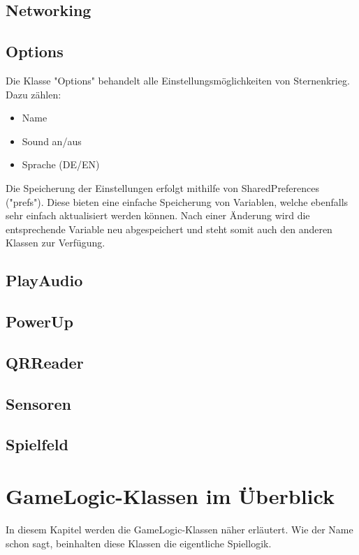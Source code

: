 \documentclass[11pt]{article} %
\begin{document}
\subsection{Networking}

\subsection{Options}
Die Klasse "Options" behandelt alle Einstellungsmöglichkeiten von Sternenkrieg. Dazu zählen:
\begin{itemize}
\item Name
\item Sound an/aus
\item Sprache (DE/EN)
\end{itemize}
Die Speicherung der Einstellungen erfolgt mithilfe von SharedPreferences ("prefs"). Diese bieten eine einfache Speicherung von Variablen, welche ebenfalls sehr einfach aktualisiert werden können. Nach einer Änderung wird die entsprechende Variable neu abgespeichert und steht somit auch den anderen Klassen zur Verfügung.

\subsection{PlayAudio}

\subsection{PowerUp}

\subsection{QRReader}

\subsection{Sensoren}

\subsection{Spielfeld}

\section{GameLogic-Klassen im Überblick}
In diesem Kapitel werden die GameLogic-Klassen näher erläutert. Wie der Name schon sagt, beinhalten diese Klassen die eigentliche Spiellogik.
\end{document}
